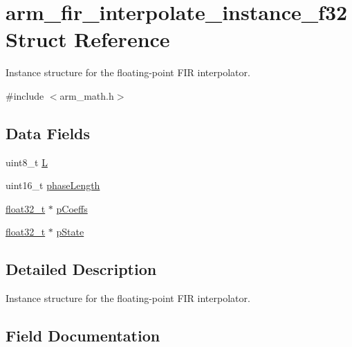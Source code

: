 \hypertarget{structarm__fir__interpolate__instance__f32}{}\section{arm\+\_\+fir\+\_\+interpolate\+\_\+instance\+\_\+f32 Struct Reference}
\label{structarm__fir__interpolate__instance__f32}


Instance structure for the floating-\/point F\+IR interpolator.  




{\ttfamily \#include $<$arm\+\_\+math.\+h$>$}

\subsection*{Data Fields}
\begin{DoxyCompactItemize}
\item 
uint8\+\_\+t \mbox{\hyperlink{structarm__fir__interpolate__instance__f32_aee73cc056696e504430c53eaa9c58cf0}{L}}
\item 
uint16\+\_\+t \mbox{\hyperlink{structarm__fir__interpolate__instance__f32_a8f92bb07e0812f94679438cdf412b26a}{phase\+Length}}
\item 
\mbox{\hyperlink{arm__math_8h_a4611b605e45ab401f02cab15c5e38715}{float32\+\_\+t}} $\ast$ \mbox{\hyperlink{structarm__fir__interpolate__instance__f32_aacbb8dd8eeba4b21fc2bb40076405ee3}{p\+Coeffs}}
\item 
\mbox{\hyperlink{arm__math_8h_a4611b605e45ab401f02cab15c5e38715}{float32\+\_\+t}} $\ast$ \mbox{\hyperlink{structarm__fir__interpolate__instance__f32_a335c87e6fdc4b96601d95a5de8b9c463}{p\+State}}
\end{DoxyCompactItemize}


\subsection{Detailed Description}
Instance structure for the floating-\/point F\+IR interpolator. 

\subsection{Field Documentation}
\mbox{\label{structarm__fir__interpolate__instance__f32_aee73cc056696e504430c53eaa9c58cf0}} 

